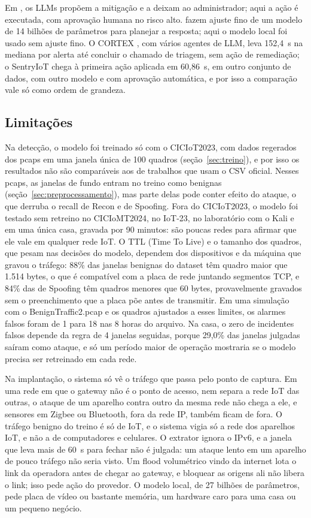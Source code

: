 Em , os LLMs propõem a mitigação e a deixam ao administrador; aqui a ação é executada, com aprovação humana no risco alto.  fazem ajuste fino de um modelo de 14 bilhões de parâmetros para planejar a resposta; aqui o modelo local foi usado sem ajuste fino. O CORTEX \cite{wei2025cortex}, com vários agentes de LLM, leva 152,4~s na mediana por alerta até concluir o chamado de triagem, sem ação de remediação; o SentryIoT chega à primeira ação aplicada em 60,86~s, em outro conjunto de dados, com outro modelo e com aprovação automática, e por isso a comparação vale só como ordem de grandeza.

\subsection{Limitações}
\label{sec:limitacoes}

Na detecção, o modelo foi treinado só com o CICIoT2023, com dados regerados dos pcaps em uma janela única de 100 quadros (seção~\ref{sec:treino}), e por isso os resultados não são comparáveis aos de trabalhos que usam o CSV oficial. Nesses pcaps, as janelas de fundo entram no treino como benignas (seção~\ref{sec:preprocessamento}), mas parte delas pode conter efeito do ataque, o que derruba o recall de Recon e de Spoofing. Fora do CICIoT2023, o modelo foi testado sem retreino no CICIoMT2024, no IoT-23, no laboratório com o Kali e em uma única casa, gravada por 90 minutos: são poucas redes para afirmar que ele vale em qualquer rede IoT. O TTL (Time To Live) e o tamanho dos quadros, que pesam nas decisões do modelo, dependem dos dispositivos e da máquina que gravou o tráfego: 88\% das janelas benignas do dataset têm quadro maior que 1.514 bytes, o que é compatível com a placa de rede juntando segmentos TCP, e 84\% das de Spoofing têm quadros menores que 60 bytes, provavelmente gravados sem o preenchimento que a placa põe antes de transmitir. Em uma simulação com o BenignTraffic2.pcap e os quadros ajustados a esses limites, os alarmes falsos foram de 1 para 18 nas 8 horas do arquivo. Na casa, o zero de incidentes falsos depende da regra de 4 janelas seguidas, porque 29,0\% das janelas julgadas saíram como ataque, e só um período maior de operação mostraria se o modelo precisa ser retreinado em cada rede.

Na implantação, o sistema só vê o tráfego que passa pelo ponto de captura. Em uma rede em que o gateway não é o ponto de acesso, nem separa a rede IoT das outras, o ataque de um aparelho contra outro da mesma rede não chega a ele, e sensores em Zigbee ou Bluetooth, fora da rede IP, também ficam de fora. O tráfego benigno do treino é só de IoT, e o sistema vigia só a rede dos aparelhos IoT, e não a de computadores e celulares. O extrator ignora o IPv6, e a janela que leva mais de 60~s para fechar não é julgada: um ataque lento em um aparelho de pouco tráfego não seria visto. Um flood volumétrico vindo da internet lota o link da operadora antes de chegar ao gateway, e bloquear as origens ali não libera o link; isso pede ação do provedor. O modelo local, de 27 bilhões de parâmetros, pede placa de vídeo ou bastante memória, um hardware caro para uma casa ou um pequeno negócio.

